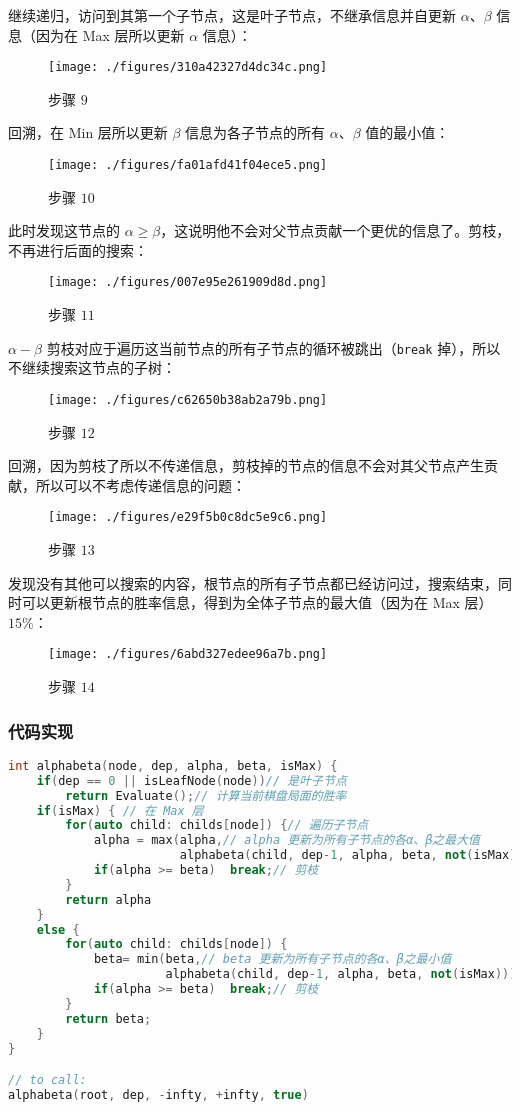 继续递归，访问到其第一个子节点，这是叶子节点，不继承信息并自更新 $\alpha$、$\beta$ 信息（因为在 Max 层所以更新 $\alpha$ 信息）：
\begin{figure}[ht]
\centering
\texttt{[image: ./figures/310a42327d4dc34c.png]}
\caption{步骤 $9$} \label{fig_mmsab_40}
\end{figure}
回溯，在 Min 层所以更新 $\beta$ 信息为各子节点的所有 $\alpha$、$\beta$ 值的最小值：
\begin{figure}[ht]
\centering
\texttt{[image: ./figures/fa01afd41f04ece5.png]}
\caption{步骤 $10$} \label{fig_mmsab_42}
\end{figure}
此时发现这节点的 $\alpha \ge \beta$，这说明他不会对父节点贡献一个更优的信息了。剪枝，不再进行后面的搜索：
\begin{figure}[ht]
\centering
\texttt{[image: ./figures/007e95e261909d8d.png]}
\caption{步骤 $11$} \label{fig_mmsab_43}
\end{figure}
$\alpha-\beta$ 剪枝对应于遍历这当前节点的所有子节点的循环被跳出（\verb`break` 掉），所以不继续搜索这节点的子树：
\begin{figure}[ht]
\centering
\texttt{[image: ./figures/c62650b38ab2a79b.png]}
\caption{步骤 $12$} \label{fig_mmsab_44}
\end{figure}
回溯，因为剪枝了所以不传递信息，剪枝掉的节点的信息不会对其父节点产生贡献，所以可以不考虑传递信息的问题：
\begin{figure}[ht]
\centering
\texttt{[image: ./figures/e29f5b0c8dc5e9c6.png]}
\caption{步骤 $13$} \label{fig_mmsab_45}
\end{figure}
发现没有其他可以搜索的内容，根节点的所有子节点都已经访问过，搜索结束，同时可以更新根节点的胜率信息，得到为全体子节点的最大值（因为在 Max 层）$15\%$：
\begin{figure}[ht]
\centering
\texttt{[image: ./figures/6abd327edee96a7b.png]}
\caption{步骤 $14$} \label{fig_mmsab_46}
\end{figure}

\subsubsection{代码实现}
\begin{lstlisting}[language=cpp]
int alphabeta(node, dep, alpha, beta, isMax) {      
    if(dep == 0 || isLeafNode(node))// 是叶子节点
        return Evaluate();// 计算当前棋盘局面的胜率
    if(isMax) { // 在 Max 层
        for(auto child: childs[node]) {// 遍历子节点
            alpha = max(alpha,// alpha 更新为所有子节点的各α、β之最大值
			            alphabeta(child, dep-1, alpha, beta, not(isMax)))   
            if(alpha >= beta)  break;// 剪枝
        }
        return alpha
    }
    else {
        for(auto child: childs[node]) {
        	beta= min(beta,// beta 更新为所有子节点的各α、β之最小值
			          alphabeta(child, dep-1, alpha, beta, not(isMax))) 
            if(alpha >= beta)  break;// 剪枝
		}
        return beta;
    }
}

// to call: 
alphabeta(root, dep, -infty, +infty, true)
\end{lstlisting}
